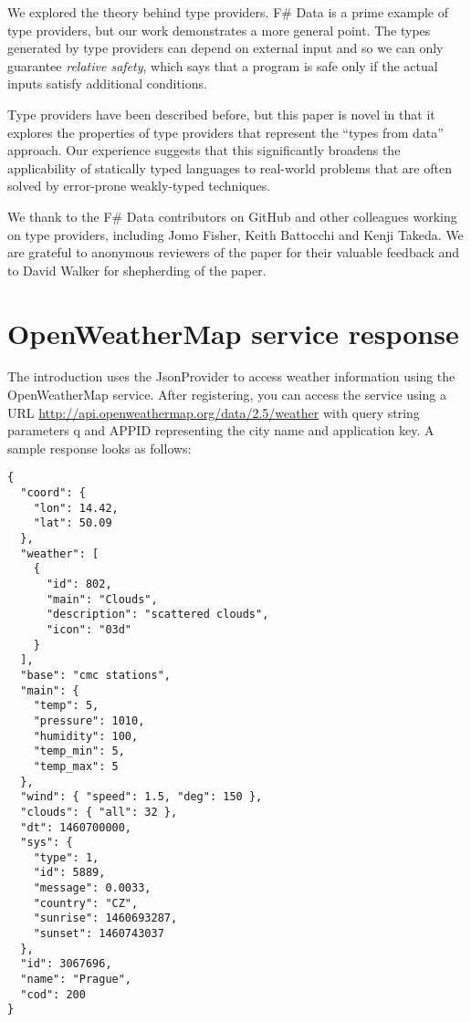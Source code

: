 \documentclass[10pt,nocopyrightspace]{sigplanconf}
\newcommand{\strf}[1]{\textnormal{\textcolor{strclr}{\sffamily #1}}}
\newcommand{\ident}[1]{\textnormal{\sffamily #1}}
\begin{document}
We explored the theory behind type providers. F\# Data is a prime example of
type providers, but our work demonstrates a more general point. The types generated by type
providers can depend on external input and so we can only guarantee \emph{relative safety},
which says that a program is safe only if the actual inputs satisfy additional conditions.

Type providers have been described before, but this paper is novel in that it explores the
properties of type providers that represent the ``types from data'' approach. Our experience suggests
that this significantly broadens the applicability of statically typed languages to real-world
problems that are often solved by error-prone weakly-typed techniques.

\acks
We thank to the F\# Data contributors on GitHub and other colleagues working
on type providers, including Jomo Fisher, Keith Battocchi and Kenji Takeda. We are
grateful to anonymous reviewers of the paper for their valuable feedback and to
David Walker for shepherding of the paper.




\appendix

\section{OpenWeatherMap service response}
\label{sec:appendix-weather}

The introduction uses the \ident{JsonProvider} to access weather
information using the OpenWeatherMap service. After registering, you can access the service
using a URL \url{http://api.openweathermap.org/data/2.5/weather} with query string parameters
\strf{q} and \strf{APPID} representing the city name and application key. A sample response looks
as follows:

\vspace{-1em}
{\small\begin{verbatim}
{
  "coord": {
    "lon": 14.42,
    "lat": 50.09
  },
  "weather": [
    {
      "id": 802,
      "main": "Clouds",
      "description": "scattered clouds",
      "icon": "03d"
    }
  ],
  "base": "cmc stations",
  "main": {
    "temp": 5,
    "pressure": 1010,
    "humidity": 100,
    "temp_min": 5,
    "temp_max": 5
  },
  "wind": { "speed": 1.5, "deg": 150 },
  "clouds": { "all": 32 },
  "dt": 1460700000,
  "sys": {
    "type": 1,
    "id": 5889,
    "message": 0.0033,
    "country": "CZ",
    "sunrise": 1460693287,
    "sunset": 1460743037
  },
  "id": 3067696,
  "name": "Prague",
  "cod": 200
}
\end{verbatim}}
\end{document}
